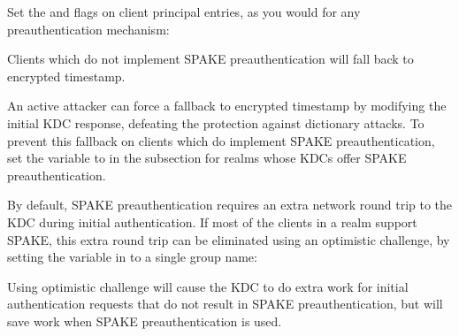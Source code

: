\documentclass[letterpaper,10pt,english]{sphinxmanual}
\begin{document}
\sphinxAtStartPar
Set the  and  flags on client
principal entries, as you would for any preauthentication mechanism:

\begin{sphinxVerbatim}[commandchars=\\\{\}]
    
\end{sphinxVerbatim}

\sphinxAtStartPar
Clients which do not implement SPAKE preauthentication will fall back
to encrypted timestamp.

\sphinxAtStartPar
An active attacker can force a fallback to encrypted timestamp by
modifying the initial KDC response, defeating the protection against
dictionary attacks.  To prevent this fallback on clients which do
implement SPAKE preauthentication, set the
 variable to  in the
{\hyperref[\detokenize{admin/conf_files/krb5_conf:realms}]{}} subsection for realms whose KDCs offer SPAKE
preauthentication.

\sphinxAtStartPar
By default, SPAKE preauthentication requires an extra network round
trip to the KDC during initial authentication.  If most of the clients
in a realm support SPAKE, this extra round trip can be eliminated
using an optimistic challenge, by setting the
 variable in {\hyperref[\detokenize{admin/conf_files/kdc_conf:kdcdefaults}]{}} to a
single group name:

\begin{sphinxVerbatim}[commandchars=\\\{\}]
\PYG{p}{[}\PYG{p}{]}
      
\end{sphinxVerbatim}

\sphinxAtStartPar
Using optimistic challenge will cause the KDC to do extra work for
initial authentication requests that do not result in SPAKE
preauthentication, but will save work when SPAKE preauthentication is
used.
\end{document}
